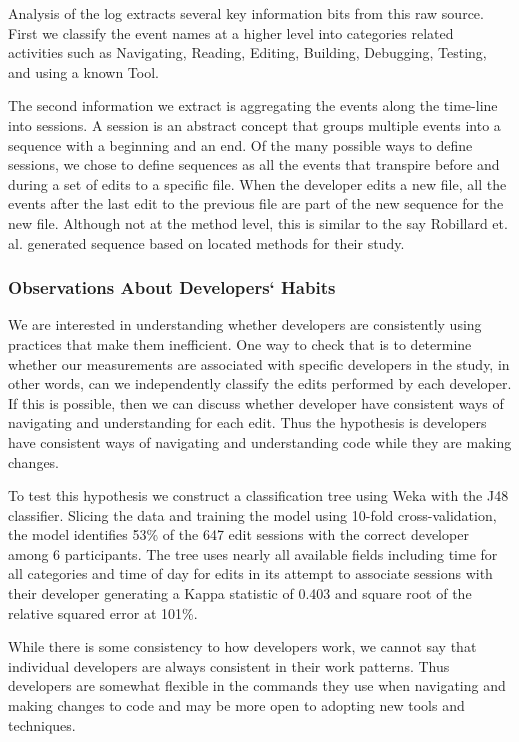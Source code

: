 \documentclass{sig-alternate}
\begin{document}
Analysis of the log extracts several key information bits from this raw source.  First we classify the event names at a higher level into categories related activities such as Navigating, Reading, Editing, Building, Debugging,  Testing, and using a  known Tool.  

The second information we extract is aggregating the events along the time-line into sessions.  A session is an abstract concept that groups multiple events into a sequence with a beginning and an end.  Of the many possible ways to define sessions, we chose to define sequences as all the events that transpire before and during a set of edits to a specific file.  When the developer edits a new file, all the events after the last edit to the previous file are part of the new sequence for the new file.  Although not at the method level, this is similar to the say Robillard et. al. generated sequence based on located methods for their study.\cite{wbsnipes:Robillard2004How}

\subsubsection{Observations About Developers` Habits}

We are interested in understanding whether developers are consistently using practices that make them inefficient.  One way to check that is to determine whether our measurements are associated with specific developers in the study, in other words, can we independently classify the edits performed by each developer.  If this is possible, then we can discuss whether developer have consistent ways of navigating and understanding for each edit.  Thus the hypothesis is developers have consistent ways of navigating and understanding code while they are making changes.

To test this hypothesis we construct a classification tree using Weka \cite{Hall2009WEKA} with the J48 classifier.  Slicing the data and training the model using 10-fold cross-validation, the model identifies 53\% of the 647 edit sessions with the correct developer among 6 participants.  The tree uses nearly all available fields including time for all categories and time of day for edits in its attempt to associate sessions with their developer generating a Kappa statistic of 0.403  and square root of the relative squared error at 101\%.  

While there is some consistency to how developers work, we cannot say that individual developers are always consistent in their work patterns.  Thus developers are somewhat flexible in the commands they use when navigating and making changes to code and may be more open to adopting new tools and techniques.\
\end{document}
